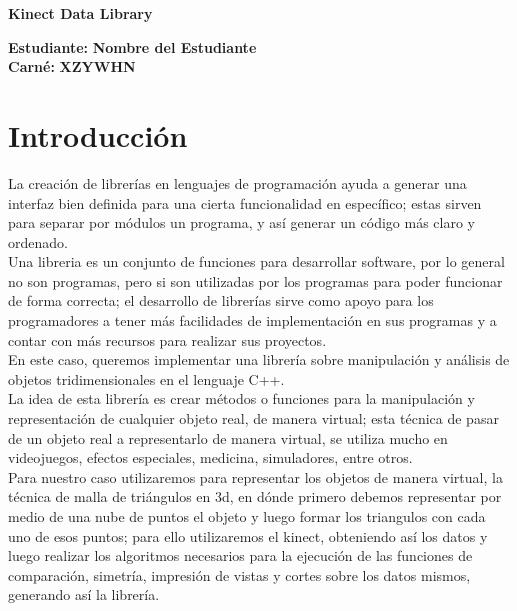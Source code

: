 \documentclass[letterpaper]{article}
\begin{document}
\vspace*{2cm}

\begin{center}
\Huge
\textbf{Kinect Data Library}
\vspace*{1cm}
\end{center}

\noindent
\small\baselineskip=14pt
\textbf{Estudiante:} \textbf{Nombre del Estudiante}\\
\textbf{Carné:} \textbf{XZYWHN}\\

\section{Introducción}
La creación de librerías en lenguajes de programación ayuda a generar una interfaz bien definida para una cierta funcionalidad en específico; estas sirven para separar por módulos un programa, y así generar un código más claro y ordenado.\\

Una libreria es un conjunto de funciones para desarrollar software, por lo general no son programas, pero si son utilizadas por los programas para poder funcionar de forma correcta; el desarrollo de librerías sirve como apoyo para los programadores a tener más facilidades de implementación 
en sus programas y a contar con más recursos para realizar sus proyectos.\\

En este caso, queremos implementar una librería sobre manipulación y análisis de objetos tridimensionales
en el lenguaje C++.\\

La idea  de esta librería es crear métodos o funciones para la manipulación y representación 
de cualquier objeto real, de manera virtual; esta técnica de pasar de un objeto real a representarlo de manera virtual, se utiliza mucho en videojuegos, efectos especiales, medicina, simuladores, entre otros.\\

 Para nuestro caso utilizaremos para representar los objetos de manera virtual, la técnica de malla de triángulos en 3d, en dónde primero debemos representar por medio de una nube de puntos el objeto y luego formar los triangulos con cada uno de esos puntos; para ello utilizaremos el kinect, obteniendo así los datos y luego realizar los algoritmos necesarios para la ejecución de las funciones de comparación, simetría, impresión de vistas y cortes sobre los datos mismos, generando así la librería. 
\end{document}
